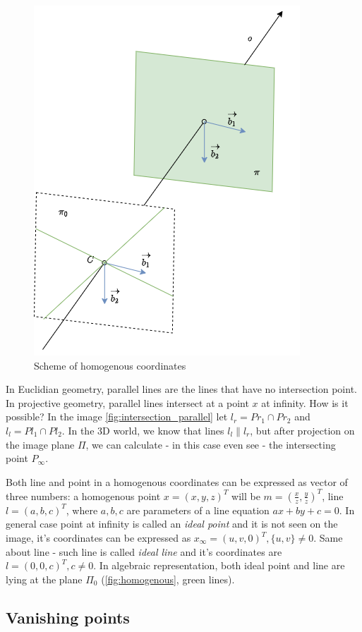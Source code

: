 \begin{figure}[h]
    \centering
    \includegraphics[width=.5\textwidth]{graphics/homogenous.png}
    \caption{Scheme of homogenous coordinates}
    \label{fig:homogenous}
\end{figure}

In Euclidian geometry, parallel lines are the lines that have no intersection point. 
In projective geometry, parallel lines intersect at a point $x$ at infinity. 
How is it possible? 
In the image \autoref{fig:intersection_parallel} let $l_r = Pr_1 \cap Pr_2 $ and $l_l = Pl_1 \cap Pl_2$. 
In the 3D world, we know that lines $l_l \parallel l_r$, but after projection on the image plane $\Pi$, we can calculate - in this case even see - the intersecting point $P_{\infty}$. 

Both line and point in a homogenous coordinates can be expressed as vector of three numbers: a homogenous point $x = (x, y, z)^T$ will be $m = (\frac{x}{z}, \frac{y}{z})^T$, line $l = (a, b, c)^T$, where $a, b, c$ are parameters of a line equation $ax + by + c = 0$. 
In general case point at infinity is called an \textit{ideal point} and it is not seen on the image, it's coordinates can be expressed as $x_{\infty} = (u, v, 0)^T, \{u, v\} \neq 0$. Same about line - such line is called \textit{ideal line} and it's coordinates are $l = (0, 0, c)^T, c \neq 0$. In algebraic representation, both ideal point and line are lying at the plane $\Pi_0$ (\autoref{fig:homogenous}, green lines).

\subsection{Vanishing points}

